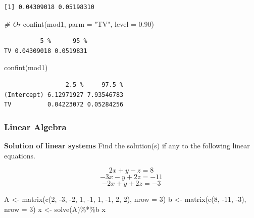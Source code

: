 \documentclass[
]{article}
\newenvironment{Shaded}{\begin{snugshade}}{\end{snugshade}}
\newcommand{\AttributeTok}[1]{\textcolor[rgb]{0.77,0.63,0.00}{#1}}
\newcommand{\CommentTok}[1]{\textcolor[rgb]{0.56,0.35,0.01}{\textit{#1}}}
\newcommand{\DecValTok}[1]{\textcolor[rgb]{0.00,0.00,0.81}{#1}}
\newcommand{\FloatTok}[1]{\textcolor[rgb]{0.00,0.00,0.81}{#1}}
\newcommand{\FunctionTok}[1]{\textcolor[rgb]{0.00,0.00,0.00}{#1}}
\newcommand{\NormalTok}[1]{#1}
\newcommand{\OtherTok}[1]{\textcolor[rgb]{0.56,0.35,0.01}{#1}}
\newcommand{\SpecialCharTok}[1]{\textcolor[rgb]{0.00,0.00,0.00}{#1}}
\newcommand{\StringTok}[1]{\textcolor[rgb]{0.31,0.60,0.02}{#1}}
\begin{document}
\begin{verbatim}
[1] 0.04309018 0.05198310
\end{verbatim}

\begin{Shaded}
\begin{Highlighting}[]
\CommentTok{\# Or}
\FunctionTok{confint}\NormalTok{(mod1, }\AttributeTok{parm =} \StringTok{"TV"}\NormalTok{, }\AttributeTok{level =} \FloatTok{0.90}\NormalTok{)}
\end{Highlighting}
\end{Shaded}

\begin{verbatim}
          5 %      95 %
TV 0.04309018 0.0519831
\end{verbatim}

\begin{Shaded}
\begin{Highlighting}[]
\FunctionTok{confint}\NormalTok{(mod1)}
\end{Highlighting}
\end{Shaded}

\begin{verbatim}
                 2.5 %     97.5 %
(Intercept) 6.12971927 7.93546783
TV          0.04223072 0.05284256
\end{verbatim}

\hypertarget{linear-algebra}{%
\subsubsection{Linear Algebra}\label{linear-algebra}}

\textbf{Solution of linear systems} Find the solution(s) if any to the following linear equations.

\[2x + y - z = 8\]
\[-3x - y + 2z = -11\]
\[-2x + y + 2z = -3\]

\begin{Shaded}
\begin{Highlighting}[]
\NormalTok{A }\OtherTok{\textless{}{-}} \FunctionTok{matrix}\NormalTok{(}\FunctionTok{c}\NormalTok{(}\DecValTok{2}\NormalTok{, }\SpecialCharTok{{-}}\DecValTok{3}\NormalTok{, }\SpecialCharTok{{-}}\DecValTok{2}\NormalTok{, }\DecValTok{1}\NormalTok{, }\SpecialCharTok{{-}}\DecValTok{1}\NormalTok{, }\DecValTok{1}\NormalTok{, }\SpecialCharTok{{-}}\DecValTok{1}\NormalTok{, }\DecValTok{2}\NormalTok{, }\DecValTok{2}\NormalTok{), }\AttributeTok{nrow =} \DecValTok{3}\NormalTok{)}
\NormalTok{b }\OtherTok{\textless{}{-}} \FunctionTok{matrix}\NormalTok{(}\FunctionTok{c}\NormalTok{(}\DecValTok{8}\NormalTok{, }\SpecialCharTok{{-}}\DecValTok{11}\NormalTok{, }\SpecialCharTok{{-}}\DecValTok{3}\NormalTok{), }\AttributeTok{nrow =} \DecValTok{3}\NormalTok{)}
\NormalTok{x }\OtherTok{\textless{}{-}} \FunctionTok{solve}\NormalTok{(A)}\SpecialCharTok{\%*\%}\NormalTok{b}
\NormalTok{x}
\end{Highlighting}
\end{Shaded}
\end{document}
